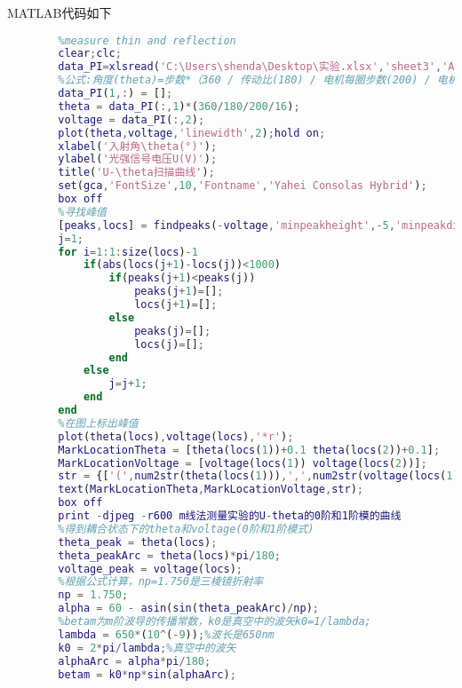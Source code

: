 \documentclass{zjureport}
\begin{document}
\begin{clause}
		\item MATLAB代码如下
		\begin{lstlisting}[language=MATLAB]
		%Experiment of Light Information Science&Technology
		%measure thin and reflection
		clear;clc;
		data_PI=xlsread('C:\Users\shenda\Desktop\实验.xlsx','sheet3','A3:B8851');
		%公式:角度(theta)=步数*（360 / 传动比(180) / 电机每圈步数(200) / 电机细分数(16)）
		data_PI(1,:) = [];
		theta = data_PI(:,1)*(360/180/200/16);
		voltage = data_PI(:,2);
		plot(theta,voltage,'linewidth',2);hold on;
		xlabel('入射角\theta(°)');
		ylabel('光强信号电压U(V)');
		title('U-\theta扫描曲线');
		set(gca,'FontSize',10,'Fontname','Yahei Consolas Hybrid');
		box off
		%寻找峰值
		[peaks,locs] = findpeaks(-voltage,'minpeakheight',-5,'minpeakdistance',1);
		j=1;
		for i=1:1:size(locs)-1
			if(abs(locs(j+1)-locs(j))<1000)
				if(peaks(j+1)<peaks(j))
					peaks(j+1)=[];
					locs(j+1)=[];
				else
					peaks(j)=[];
					locs(j)=[];
				end
			else
				j=j+1;
			end        
		end
		%在图上标出峰值
		plot(theta(locs),voltage(locs),'*r');
		MarkLocationTheta = [theta(locs(1))+0.1 theta(locs(2))+0.1];
		MarkLocationVoltage = [voltage(locs(1)) voltage(locs(2))];
		str = {['(',num2str(theta(locs(1))),',',num2str(voltage(locs(1))),')',],['(',num2str(theta(locs(2))),',',num2str(voltage(locs(2))),')']};
		text(MarkLocationTheta,MarkLocationVoltage,str);
		box off
		print -djpeg -r600 m线法测量实验的U-theta的0阶和1阶模的曲线
		%得到耦合状态下的theta和voltage(0阶和1阶模式)
		theta_peak = theta(locs);
		theta_peakArc = theta(locs)*pi/180;
		voltage_peak = voltage(locs);
		%根据公式计算，np=1.750是三棱镜折射率
		np = 1.750;
		alpha = 60 - asin(sin(theta_peakArc)/np);
		%betam为m阶波导的传播常数，k0是真空中的波矢k0=1/lambda;
		lambda = 650*(10^(-9));%波长是650nm                                                                                                                                                                                                                                                                                                                                                                                                                                                                                                                                                                                                                                                                                                                                                                                                                                                                                                                                                                                                       
		k0 = 2*pi/lambda;%真空中的波矢
		alphaArc = alpha*pi/180;
		betam = k0*np*sin(alphaArc); 
		

\end{lstlisting}
\end{clause}
\end{document}
